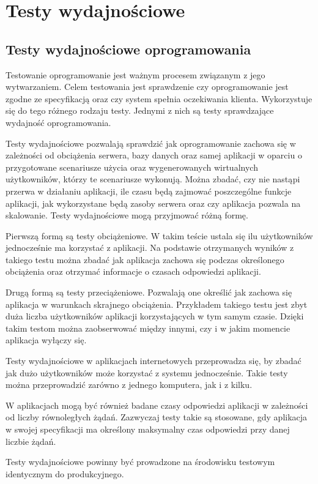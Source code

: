 \chapter{Testy wydajnościowe}
\section{Testy wydajnościowe oprogramowania}
 Testowanie oprogramowanie jest ważnym procesem związanym z jego wytwarzaniem.  Celem testowania jest sprawdzenie czy oprogramowanie jest zgodne ze specyfikacją oraz czy system spełnia oczekiwania klienta. Wykorzystuje się do tego różnego rodzaju testy. Jednymi z nich są testy  sprawdzające wydajność oprogramowania. 

Testy wydajnościowe pozwalają sprawdzić jak oprogramowanie zachowa się w zależności od obciążenia serwera, bazy danych oraz samej aplikacji w oparciu o przygotowane scenariusze użycia oraz wygenerowanych wirtualnych użytkowników, którzy te scenariusze wykonują. Można zbadać, czy nie nastąpi przerwa w działaniu aplikacji, ile czasu będą zajmować poszczególne funkcje aplikacji, jak wykorzystane będą zasoby serwera oraz czy aplikacja pozwala na skalowanie. Testy wydajnościowe mogą przyjmować różną formę.

Pierwszą formą są testy obciążeniowe. W takim teście ustala się ilu użytkowników jednocześnie ma korzystać z aplikacji. Na podstawie otrzymanych wyników z takiego testu można zbadać jak aplikacja zachowa się podczas określonego obciążenia oraz otrzymać informacje o czasach odpowiedzi aplikacji.

Drugą formą są testy przeciążeniowe. Pozwalają one określić jak zachowa się aplikacja w warunkach skrajnego obciążenia. Przykładem takiego testu jest zbyt duża liczba użytkowników aplikacji korzystających w tym samym czasie. Dzięki takim testom można zaobserwować między innymi, czy i w jakim momencie aplikacja wyłączy się.

Testy wydajnościowe w aplikacjach internetowych  przeprowadza się, by zbadać jak dużo użytkowników może korzystać z systemu jednocześnie. Takie testy można przeprowadzić zarówno z jednego komputera, jak i z kilku.

W aplikacjach mogą być również badane czasy odpowiedzi aplikacji w zależności od liczby równoległych żądań. Zazwyczaj testy takie są stosowane, gdy aplikacja w swojej specyfikacji ma określony maksymalny czas odpowiedzi przy danej liczbie żądań.

Testy wydajnościowe powinny być prowadzone na środowisku testowym identycznym do produkcyjnego.

